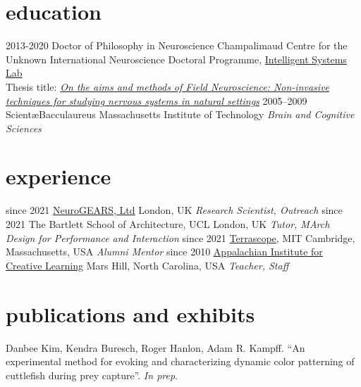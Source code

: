 \documentclass[]{friggeri-cv}
\begin{document}
\section{education}

\begin{entrylist}
  \entry
    {2013-2020}
    {Doctor of Philosophy in Neuroscience}
    {Champalimaud Centre for the Unknown}
    {International Neuroscience Doctoral Programme, \href{http://neuro.fchampalimaud.org/en/research/investigators/research-groups/group/Kampff/}{Intelligent Systems Lab} \\ Thesis title: \href{https://www.dropbox.com/s/iqyfmj1rmcn083z/DanbeeKim_INDP2013_PhDThesis.pdf?dl=0}{\emph{On the aims and methods of Field Neuroscience: Non-invasive techniques for studying nervous systems in natural settings}}}
  \entry
    {2005–2009}
    {Scient\ae Bacculaureus}
    {Massachusetts Institute of Technology}
	{\emph{Brain and Cognitive Sciences}}
\end{entrylist}

\section{experience}

\begin{entrylist}
  \entry
    {since 2021}
    {\href{https://neurogears.org/}{NeuroGEARS, Ltd}}
    {London, UK}
    {\emph{Research Scientist, Outreach}}
  \entry
    {since 2021}
	{The Bartlett School of Architecture, UCL}
	{London, UK}
	{\emph{Tutor, MArch Design for Performance and Interaction}}
  \entry
	{since 2021}
	{\href{https://terrascope.mit.edu/}{Terrascope}, MIT}
	{Cambridge, Massachusetts, USA}
	{\emph{Alumni Mentor}}
  \entry
    {since 2010}
    {\href{http://www.appalachianinstitute.org/}{Appalachian Institute for Creative Learning}}
    {Mars Hill, North Carolina, USA}
    {\emph{Teacher, Staff}}
\end{entrylist}

\section{publications and exhibits}

Danbee Kim, Kendra Buresch, Roger Hanlon, Adam R. Kampff. ``An experimental method for evoking and characterizing dynamic color patterning of cuttlefish during prey capture''. \emph{In prep}.
\end{document}
